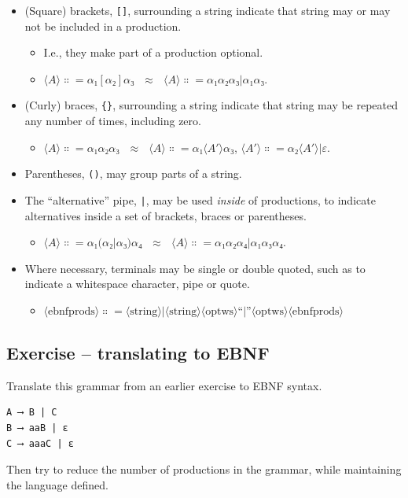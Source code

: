 \documentclass[11pt]{article}
\theoremstyle{definition}
\begin{document}
\begin{itemize}
\item (Square) brackets, \texttt{[]}, surrounding a string
indicate that string may or may not be included in a production.
\begin{itemize}
\item I.e., they make part of a production optional.
\item \(⟨A⟩ ∷= α₁ [ α₂ ] α₃ \ \ \ ≈ \ \ \ ⟨A⟩ ∷= α₁ α₂ α₃ | α₁ α₃\).
\end{itemize}
\item (Curly) braces, \texttt{\{\}}, surrounding a string
indicate that string may be repeated any number of times,
including zero.
\begin{itemize}
\item \(⟨A⟩ ∷= α₁ { α₂ } α₃ \ \ \ ≈ \ \ \ ⟨A⟩ ∷= α₁ ⟨A′⟩ α₃\), \(⟨A′⟩ ∷= α₂ ⟨A′⟩ | ε\).
\end{itemize}
\item Parentheses, \texttt{()}, may group parts of a string.
\item The “alternative” pipe, \texttt{|}, may be used \emph{inside} of productions,
to indicate alternatives inside a set of brackets, braces
or parentheses.
\begin{itemize}
\item \(⟨A⟩ ∷= α₁ (α₂ | α₃) α₄ \ \ \ ≈ \ \ \ ⟨A⟩ ∷= α₁ α₂ α₄ | α₁ α₃ α₄\).
\end{itemize}
\item Where necessary, terminals may be single or double quoted,
such as to indicate a whitespace character, pipe or quote.
\begin{itemize}
\item \(⟨\text{ebnfprods}⟩ ∷= ⟨\text{string}⟩ | ⟨\text{string}⟩ ⟨\text{optws}⟩ “|” ⟨\text{optws}⟩ ⟨\text{ebnfprods}⟩\)
\end{itemize}
\end{itemize}

\subsection{Exercise – translating to EBNF}
\label{sec:org2e6de78}

Translate this grammar from an earlier exercise to EBNF syntax.
\begin{verbatim}
A ⟶ B | C
B ⟶ aaB | ε
C ⟶ aaaC | ε
\end{verbatim}
Then try to reduce the number of productions in the grammar,
while maintaining the language defined.
\end{document}

